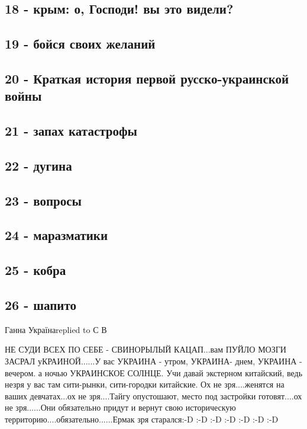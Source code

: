 \subsection{18 - крым: о, Господи! вы это видели?}

\subsection{19 - бойся своих желаний}

\subsection{20 - Краткая история первой русско-украинской войны}

\subsection{21 - запах катастрофы}

\subsection{22 - дугина}

\subsection{23 - вопросы}

\subsection{24 - маразматики}

\subsection{25 - кобра}

\subsection{26 - шапито}

Ганна Українаreplied to С В

НЕ СУДИ ВСЕХ ПО СЕБЕ - СВИНОРЫЛЫЙ КАЦАП...вам ПУЙЛО МОЗГИ ЗАСРАЛ
уКРАИНОЙ......У вас УКРАИНА - утром, УКРАИНА- днем, УКРАИНА - вечером. а ночью
УКРАИНСКОЕ СОЛНЦЕ. Учи давай экстерном китайский, ведь незря у вас там
сити-рынки, сити-городки китайские. Ох не зря....женятся на ваших девчатах...ох
не зря....Тайгу опустошают, место под застройки готовят....ох не зря......Они
обязательно придут и вернут свою историческую
территорию....обязательно......Ермак зря старался:-D :-D :-D :-D :-D :-D :-D


